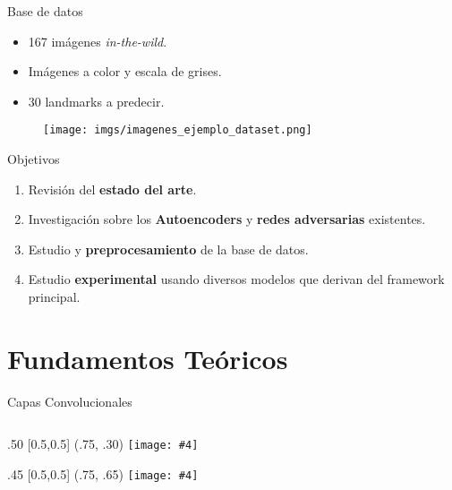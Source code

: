 \documentclass[aspectratio=43]{beamer}
\renewcommand{\cite}[1]{\footnote<.->[frame]{\fullcite{#1}}}
\newcommand{\absimage}[4][0.5,0.5]{%
	\begin{textblock}{#3}%
		[#1]%
		(#2)%
		\texttt{[image: \#4]}%
\end{textblock}}
\begin{document}
\begin{frame}{Base de datos}
  \begin{itemize}
    \item 167 imágenes \textit{in-the-wild}.
    \item Imágenes a color y escala de grises.
    \item 30 landmarks a predecir.
  \end{itemize}
  \begin{figure}
    \centering
    \texttt{[image: imgs/imagenes\_ejemplo\_dataset.png]}
  \end{figure}
  \medskip
\end{frame}

\begin{frame}{Objetivos}
  \begin{enumerate}
    \item Revisión del \textbf{estado del arte}.
    \item Investigación sobre los \textbf{Autoencoders} y \textbf{redes adversarias} existentes.
    \item Estudio y \textbf{preprocesamiento} de la base de datos.
    \item Estudio \textbf{experimental} usando diversos modelos que derivan del framework principal.
  \end{enumerate}
\end{frame}

\section{Fundamentos Teóricos}


\begin{frame}{Capas Convolucionales}
  \begin{columns}[onlytextwidth]
    \begin{column}{.5\textwidth}
      \absimage{.75, .30}{.50}{imgs/mapa_activacion.png}
      \absimage{.75, .65}{.45}{imgs/sucesion_conv_layer.png}
    \end{column}
  \end{columns}
\end{frame}
\end{document}
